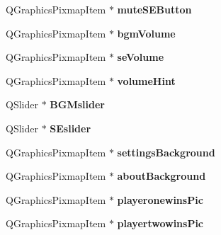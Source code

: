 \begin{DoxyCompactItemize}
\item 
Q\+Graphics\+Pixmap\+Item $\ast$ {\bfseries mute\+S\+E\+Button}\hypertarget{class_game_menu_a23666659fe3b9f0642fd53d308e9a8e0}{}\label{class_game_menu_a23666659fe3b9f0642fd53d308e9a8e0}

\item 
Q\+Graphics\+Pixmap\+Item $\ast$ {\bfseries bgm\+Volume}\hypertarget{class_game_menu_a693030c5c46cdb795d89879a2a362cc2}{}\label{class_game_menu_a693030c5c46cdb795d89879a2a362cc2}

\item 
Q\+Graphics\+Pixmap\+Item $\ast$ {\bfseries se\+Volume}\hypertarget{class_game_menu_a321abee561f05b81fb6e6570ce0b3203}{}\label{class_game_menu_a321abee561f05b81fb6e6570ce0b3203}

\item 
Q\+Graphics\+Pixmap\+Item $\ast$ {\bfseries volume\+Hint}\hypertarget{class_game_menu_a7ee482589366f76c2f28b85df5fe834a}{}\label{class_game_menu_a7ee482589366f76c2f28b85df5fe834a}

\item 
Q\+Slider $\ast$ {\bfseries B\+G\+Mslider}\hypertarget{class_game_menu_a2554f0222dad16e6943190265b4a063d}{}\label{class_game_menu_a2554f0222dad16e6943190265b4a063d}

\item 
Q\+Slider $\ast$ {\bfseries S\+Eslider}\hypertarget{class_game_menu_a1571c2f246e226b8fcc1ff927183d178}{}\label{class_game_menu_a1571c2f246e226b8fcc1ff927183d178}

\item 
Q\+Graphics\+Pixmap\+Item $\ast$ {\bfseries settings\+Background}\hypertarget{class_game_menu_a1883be9e761bc6ddf651d076792a6536}{}\label{class_game_menu_a1883be9e761bc6ddf651d076792a6536}

\item 
Q\+Graphics\+Pixmap\+Item $\ast$ {\bfseries about\+Background}\hypertarget{class_game_menu_abef2252ea78c533c26e57aeaa4b7ac75}{}\label{class_game_menu_abef2252ea78c533c26e57aeaa4b7ac75}

\item 
Q\+Graphics\+Pixmap\+Item $\ast$ {\bfseries playeronewins\+Pic}\hypertarget{class_game_menu_a607f26f22eabdc52789ec0fcb9ae1fd8}{}\label{class_game_menu_a607f26f22eabdc52789ec0fcb9ae1fd8}

\item 
Q\+Graphics\+Pixmap\+Item $\ast$ {\bfseries playertwowins\+Pic}\hypertarget{class_game_menu_a0aa1ea5e275d456d9eaaae032cbf798f}{}\label{class_game_menu_a0aa1ea5e275d456d9eaaae032cbf798f}

\end{DoxyCompactItemize}


